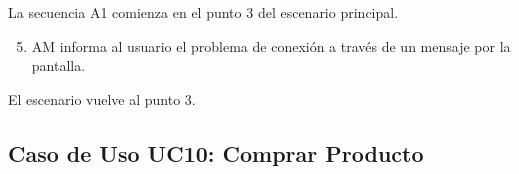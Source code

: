 \begin{framed}
La secuencia A1 comienza en el punto 3 del escenario principal.
\begin{enumerate}
    \setcounter{enumi}{4}
    \item AM informa al usuario el problema de conexión a través de un mensaje por la pantalla.
\end{enumerate}
El escenario vuelve al punto 3.

\end{framed}


\subsection{Caso de Uso UC10: Comprar Producto}

